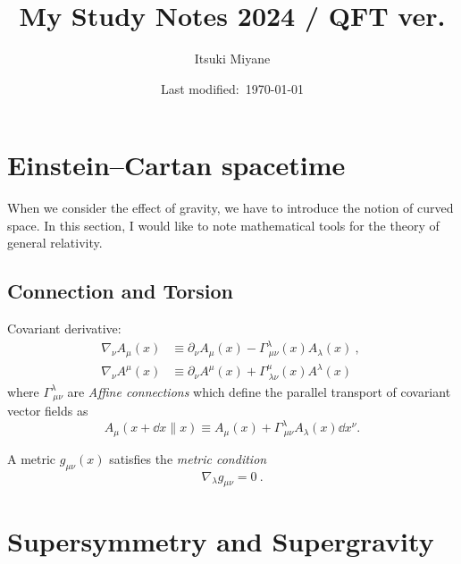 \documentclass[a4paper,pdftex]{article}
\title{My Study Notes 2024 / QFT ver.}
\author{Itsuki Miyane}
\date{Last modified:\ \today}
\begin{document}
\maketitle

\tableofcontents

\clearpage

\section{Einstein–Cartan spacetime}

When we consider the effect of gravity, we have to introduce the notion of curved space. In this section, I would like to note mathematical tools for the theory of general relativity.

\subsection{Connection and  Torsion}

Covariant derivative:
\begin{align}
  \nabla_{\nu}A_{\mu}(x)
  &\equiv
  \partial_{\nu}A_{\mu}(x)
  -
  \Gamma^{\lambda}_{\ \mu\nu}(x)A_{\lambda}(x)
  \ ,\ 
  \\
  \nabla_{\nu}A^{\mu}(x)
  &\equiv
  \partial_{\nu}A^{\mu}(x)
  +
  \Gamma^{\mu}_{\ \lambda\nu}(x)A^{\lambda}(x)
\end{align}
where $\Gamma^{\lambda}_{\ \mu\nu}$ are \textit{Affine connections} which define the parallel transport of covariant vector fields as
\begin{equation}
  A_{\mu}(x+\dd x \parallel x)
  \equiv
  A_{\mu}(x)
  +
  \Gamma^{\lambda}_{\ \mu\nu}A_{\lambda}(x)\dd x^{\nu}
  .
\end{equation}

A metric $g_{\mu\nu}(x)$ satisfies the \textit{metric condition}
\begin{equation}
  \nabla_{\lambda}g_{\mu\nu}
  =
  0
  \ .
\end{equation}
















\clearpage

\section{Supersymmetry and Supergravity}
\end{document}
